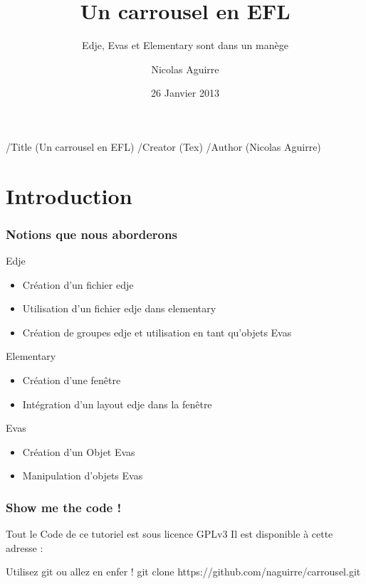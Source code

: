 \documentclass{beamer}
\begin{document}
\pdfinfo
{
  /Title       (Un carrousel en EFL)
  /Creator     (Tex)
  /Author      (Nicolas Aguirre)
}


\title{Un carrousel en EFL}
\subtitle{Edje, Evas et Elementary sont dans un manège}
\author{Nicolas Aguirre}
\date{26 Janvier 2013}

\frame{\titlepage}

\section{Introduction}
\begin{frame}
  \frametitle{Notions que nous aborderons}
  \begin{block}{Edje}
  \begin{itemize}
    \item<2-> Création d'un fichier edje
    \item<3-> Utilisation d'un fichier edje dans elementary
    \item<4-> Création de groupes edje et utilisation en tant qu'objets Evas
  \end{itemize}
  \end{block}

  \begin{block}{Elementary}
  \begin{itemize}
    \item<5-> Création d'une fenêtre
    \item<6-> Intégration d'un layout edje dans la fenêtre
  \end{itemize}
  \end{block}

  \begin{block}{Evas}
  \begin{itemize}
    \item<7-> Création d'un Objet Evas
    \item<8-> Manipulation d'objets Evas
  \end{itemize}
  \end{block}

\end{frame}

\begin{frame}
  \frametitle{Show me the code !}
  Tout le Code de ce tutoriel est sous licence GPLv3
  Il est disponible à cette adresse :
  \begin{block}{Utilisez git ou allez en enfer !}
    git clone https://github.com/naguirre/carrousel.git
  \end{block}
\end{frame}
\end{document}
